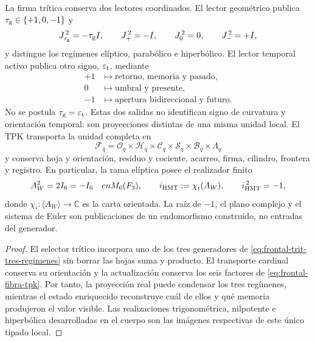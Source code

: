 \begin{proposition}
La firma trítica conserva dos lectores coordinados. El lector geométrico
publica \(\tau_{\rm g}\in\{+1,0,-1\}\) y
\begin{equation}
 J_{\tau_{\rm g}}^{\,2}=-\tau_{\rm g}I,\qquad
 J_+^{\,2}=-I,\qquad J_0^{\,2}=0,\qquad J_-^{\,2}=+I,
 \label{eq:frontal-trit-tres-regimenes}
\end{equation}
y distingue los regímenes elíptico, parabólico e hiperbólico. El lector
temporal activo publica otro signo, \(\varepsilon_{\rm t}\), mediante
\begin{equation}
 \begin{aligned}
 +1&\mapsto\text{retorno, memoria y pasado},\\
 0&\mapsto\text{umbral y presente},\\
 -1&\mapsto\text{apertura bidireccional y futuro}.
 \end{aligned}
 \label{eq:frontal-trit-tiempo}
\end{equation}
No se postula \(\tau_{\rm g}=\varepsilon_{\rm t}\). Estas dos salidas no
identifican signo de curvatura y orientación temporal: son proyecciones
distintas de una misma unidad local. El TPK transporta la
unidad completa en
\begin{equation}
 \mathcal F_q=
 \mathcal O_q\times\mathcal H_q\times\mathcal C_q\times
 \mathcal S_q\times\mathcal B_q\times\Lambda_q
 \label{eq:frontal-fibra-tpk}
\end{equation}
y conserva hoja y orientación, residuo y cociente, acarreo, firma, cilindro,
frontera y registro. En particular, la rama elíptica posee el realizador
finito
\begin{equation}
 A_W^2=2I_6=-I_6\quad\text{en }M_6(\mathbb F_3),\qquad
 i_{\rm HMT}:=\chi_i(A_W),\qquad i_{\rm HMT}^{\,2}=-1,
 \label{eq:frontal-raiz-interna-menos-uno}
\end{equation}
donde \(\chi_i:\langle A_W\rangle\to\mathbb C\) es la carta orientada.
La raíz de \(-1\), el plano complejo y el sistema de Euler son publicaciones
de un endomorfismo construido, no entradas del generador.
\end{proposition}

\begin{proof}
El selector trítico incorpora uno de los tres generadores de
\eqref{eq:frontal-trit-tres-regimenes} sin borrar las hojas suma y producto.
El transporte cardinal conserva su orientación y la actualización conserva
los seis factores de \eqref{eq:frontal-fibra-tpk}. Por tanto, la proyección
real puede condensar los tres regímenes, mientras el estado enriquecido
reconstruye cuál de ellos y qué memoria produjeron el valor visible. Las
realizaciones trigonométrica, nilpotente e hiperbólica desarrolladas en el
cuerpo son las imágenes respectivas de este único tipado local.
\end{proof}

